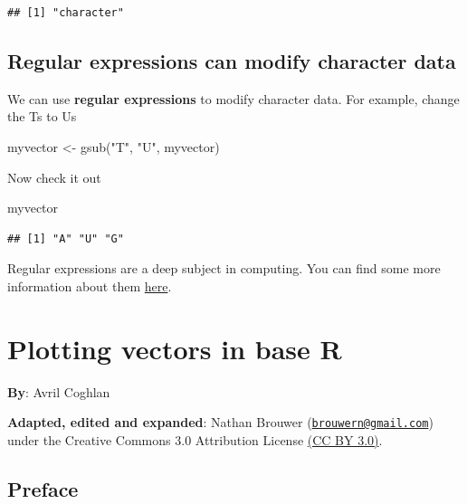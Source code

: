 \documentclass[
]{book}
\newenvironment{Shaded}{\begin{snugshade}}{\end{snugshade}}
\newcommand{\FunctionTok}[1]{\textcolor[rgb]{0.00,0.00,0.00}{#1}}
\newcommand{\NormalTok}[1]{#1}
\newcommand{\OtherTok}[1]{\textcolor[rgb]{0.56,0.35,0.01}{#1}}
\newcommand{\StringTok}[1]{\textcolor[rgb]{0.31,0.60,0.02}{#1}}
\begin{document}
\begin{verbatim}
## [1] "character"
\end{verbatim}

\hypertarget{regular-expressions-can-modify-character-data}{%
\section{Regular expressions can modify character data}\label{regular-expressions-can-modify-character-data}}

We can use \textbf{regular expressions} to modify character data. For example, change the Ts to Us

\begin{Shaded}
\begin{Highlighting}[]
\NormalTok{myvector }\OtherTok{\textless{}{-}} \FunctionTok{gsub}\NormalTok{(}\StringTok{"T"}\NormalTok{, }\StringTok{"U"}\NormalTok{, myvector)}
\end{Highlighting}
\end{Shaded}

Now check it out

\begin{Shaded}
\begin{Highlighting}[]
\NormalTok{myvector}
\end{Highlighting}
\end{Shaded}

\begin{verbatim}
## [1] "A" "U" "G"
\end{verbatim}

Regular expressions are a deep subject in computing. You can find some more information about them \href{https://rstudio-pubs-static.s3.amazonaws.com/74603_76cd14d5983f47408fdf0b323550b846.html}{here}.

\hypertarget{plotting-vectors-in-base-r}{%
\chapter{Plotting vectors in base R}\label{plotting-vectors-in-base-r}}

\textbf{By}: Avril Coghlan

\textbf{Adapted, edited and expanded}: Nathan Brouwer (\href{mailto:brouwern@gmail.com}{\nolinkurl{brouwern@gmail.com}}) under the Creative Commons 3.0 Attribution License \href{https://creativecommons.org/licenses/by/3.0/}{(CC BY 3.0)}.

\hypertarget{preface-4}{%
\section{Preface}\label{preface-4}}
\end{document}
